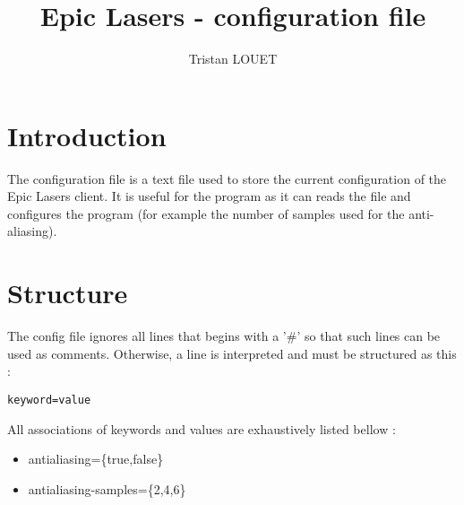 \documentclass[11pt]{article}
\title{Epic Lasers - configuration file}
\author{Tristan LOUET}
\begin{document}
\maketitle

\section{Introduction}
The configuration file is a text file used to store the current
configuration of the Epic Lasers client. It is useful for the program
as it can reads the file and configures the program (for example the
number of samples used for the anti-aliasing). 

\section{Structure}
The config file ignores all lines that begins with a '\#' so that such
lines can be used as comments.
Otherwise, a line is interpreted and must be structured as this :
\begin{verbatim}
keyword=value
\end{verbatim}

All associations of keywords and values are exhaustively listed bellow :
\begin{itemize}
\item antialiasing=\{true,false\}
\item antialiasing-samples=\{2,4,6\}
\end{itemize}
\end{document}
